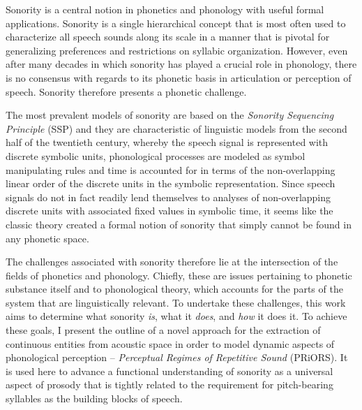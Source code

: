 \addchap{\lsPrefaceTitle}
 
Sonority is a central notion in phonetics and phonology with useful formal applications.
Sonority is a single hierarchical concept that is most often used to characterize all speech sounds along its scale in a manner that is pivotal for generalizing preferences and restrictions on syllabic organization. However, even after many decades in which sonority has played a crucial role in phonology, there is no consensus with regards to its phonetic basis in articulation or perception of speech. Sonority therefore presents a phonetic challenge.

The most prevalent models of sonority are based on the \emph{Sonority Sequencing Principle} (SSP) and they are characteristic of linguistic models from the second half of the twentieth century, whereby the speech signal is represented with discrete symbolic units, phonological processes are modeled as symbol manipulating rules and time is accounted for in terms of the non-overlapping linear order of the discrete units in the symbolic representation. Since speech signals do not in fact readily lend themselves to analyses of non-overlapping discrete units with associated fixed values in symbolic time, it seems like the classic theory created a formal notion of sonority that simply cannot be found in any phonetic space.

The challenges associated with sonority therefore lie at the intersection of the fields of phonetics and phonology. Chiefly, these are issues pertaining to phonetic substance itself and to phonological theory, which accounts for the parts of the system that are linguistically relevant.
To undertake these challenges, this work aims to determine what sonority \emph{is}, what it \emph{does}, and \emph{how} it does it. To achieve these goals, I present the outline of a novel approach for the extraction of continuous entities from acoustic space in order to model dynamic aspects of phonological perception -- \emph{Perceptual Regimes of Repetitive Sound} (PRiORS). It is used here to advance a functional understanding of sonority as a universal aspect of prosody that is tightly related to the requirement for pitch-bearing syllables as the building blocks of speech.


